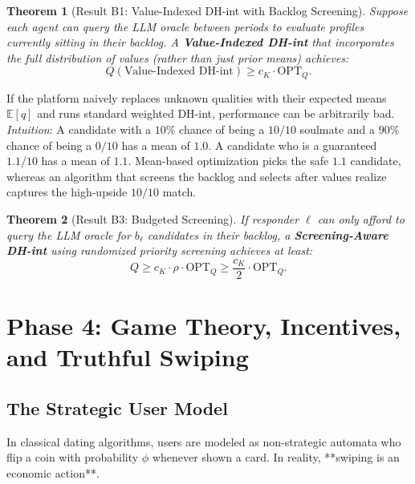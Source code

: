 \documentclass[11pt,letterpaper]{article}
\theoremstyle{definition}
\theoremstyle{plain}
\newtheorem{theorem}{Theorem}[section]
\theoremstyle{remark}
\begin{document}
\begin{theorem}[Result B1: Value-Indexed DH-int with Backlog Screening]
Suppose each agent can query the LLM oracle between periods to evaluate profiles currently sitting in their backlog. A \textbf{Value-Indexed DH-int} that incorporates the full distribution of values (rather than just prior means) achieves:
\begin{equation}
    Q(\text{Value-Indexed DH-int}) \ge c_K \cdot \mathrm{OPT}_Q.
\end{equation}
\end{theorem}

\begin{warningbox}
If the platform naively replaces unknown qualities with their expected means $\mathbb{E}[q]$ and runs standard weighted DH-int, performance can be arbitrarily bad. 
\emph{Intuition}: A candidate with a $10\%$ chance of being a $10/10$ soulmate and a $90\%$ chance of being a $0/10$ has a mean of $1.0$. A candidate who is a guaranteed $1.1/10$ has a mean of $1.1$. Mean-based optimization picks the safe $1.1$ candidate, whereas an algorithm that screens the backlog and selects after values realize captures the high-upside $10/10$ match.
\end{warningbox}

\begin{theorem}[Result B3: Budgeted Screening]
If responder $\ell$ can only afford to query the LLM oracle for $b_\ell$ candidates in their backlog, a \textbf{Screening-Aware DH-int} using randomized priority screening achieves at least:
\begin{equation}
    Q \ge c_K \cdot \rho \cdot \mathrm{OPT}_Q \ge \frac{c_K}{2} \cdot \mathrm{OPT}_Q.
\end{equation}
\end{theorem}

\newpage
\section{Phase 4: Game Theory, Incentives, and Truthful Swiping}
\label{sec:game_theory}

\subsection{The Strategic User Model}
In classical dating algorithms, users are modeled as non-strategic automata who flip a coin with probability $\phi$ whenever shown a card. In reality, **swiping is an economic action**.
\end{document}

